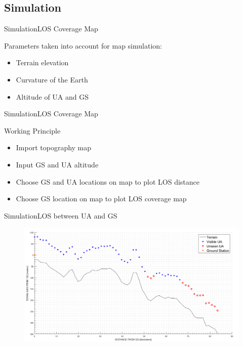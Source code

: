 \subsection{Simulation}

\begin{frame}{Simulation}{LOS Coverage Map}
  \begin{block}{Parameters taken into account for map simulation:}
	  \begin{itemize}
	  	\item Terrain elevation
	  	\item Curvature of the Earth
	  	\item Altitude of UA and GS
	  \end{itemize}
  \end{block}
\end{frame}

\begin{frame}{Simulation}{LOS Coverage Map}
  \begin{block}{Working Principle}
	  \begin{itemize}
	  	\item Import topography map
	  	\item Input GS and UA altitude
	  	\item Choose GS and UA locations on map to plot LOS distance
	  	\item Choose GS location on map to plot LOS coverage map
	  \end{itemize}
  \end{block}
\end{frame}

\begin{frame}{Simulation}{LOS between UA and GS} 
  	\begin{figure}
        \includegraphics[scale=0.29]{../report/figures/los_2points.png}
    \end{figure}
\end{frame}


